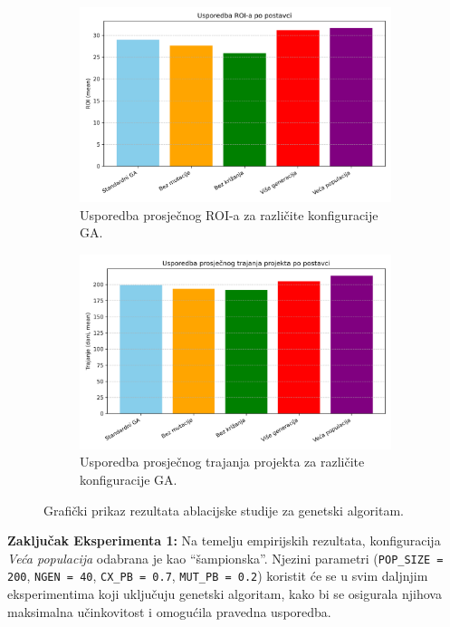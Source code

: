 \begin{figure}[H]
    \centering
    \begin{subfigure}[b]{0.48\textwidth}
        \centering
        \includegraphics[width=\textwidth]{slike/ga_usporedba_roi.png}
        \caption{Usporedba prosječnog ROI-a za različite konfiguracije GA.}
        \label{fig:ga_roi}
    \end{subfigure}
    \hfill
    \begin{subfigure}[b]{0.48\textwidth}
        \centering
        \includegraphics[width=\textwidth]{slike/ga_usporedba_trajanje.png}
        \caption{Usporedba prosječnog trajanja projekta za različite konfiguracije GA.}
        \label{fig:ga_trajanje}
    \end{subfigure}
    \caption{Grafički prikaz rezultata ablacijske studije za genetski algoritam.}
    \label{fig:ga_ablation}
\end{figure}

\textbf{Zaključak Eksperimenta 1:}  
Na temelju empirijskih rezultata, konfiguracija \emph{Veća populacija} odabrana je kao ``šampionska''. Njezini parametri (\texttt{POP\_SIZE = 200}, \texttt{NGEN = 40}, \texttt{CX\_PB = 0.7}, \texttt{MUT\_PB = 0.2}) koristit će se u svim daljnjim eksperimentima koji uključuju genetski algoritam, kako bi se osigurala njihova maksimalna učinkovitost i omogućila pravedna usporedba.

